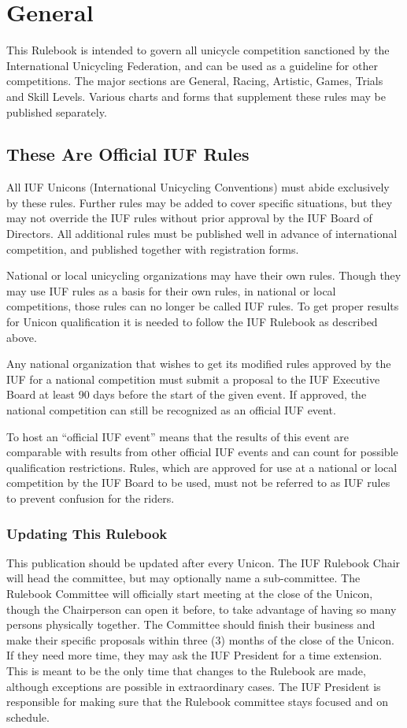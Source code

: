 \chapter{General}
This Rulebook is intended to govern all unicycle competition sanctioned by the International Unicycling Federation, and can be used as a guideline for other competitions.
The major sections are General, Racing, Artistic, Games, Trials and Skill Levels.
Various charts and forms that supplement these rules may be published separately. 

\section{These Are Official IUF Rules}
All IUF Unicons (International Unicycling Conventions) must abide exclusively by these rules.
Further rules may be added to cover specific situations, but they may not override the IUF rules without prior approval by the IUF Board of Directors.
All additional rules must be published well in advance of international competition, and published together with registration forms.

National or local unicycling organizations may have their own rules.
Though they may use IUF rules as a basis for their own rules, in national or local competitions, those rules can no longer be called IUF rules.
To get proper results for Unicon qualification it is needed to follow the IUF Rulebook as described above.

Any national organization that wishes to get its modified rules approved by the IUF for a national competition must submit a proposal to the IUF Executive Board at least 90 days before the start of the given event.
If approved, the national competition can still be recognized as an official IUF event.

To host an ``official IUF event'' means that the results of this event are comparable with results from other official IUF events and can count for possible qualification restrictions.
Rules, which are approved for use at a national or local competition by the IUF Board to be used, must not be referred to as IUF rules to prevent confusion for the riders.

\subsection{Updating This Rulebook}
This publication should be updated after every Unicon.
The IUF Rulebook Chair will head the committee, but may optionally name a sub-committee.
The Rulebook Committee will officially start meeting at the close of the Unicon, though the Chairperson can open it before, to take advantage of having so many persons physically together.
The Committee should finish their business and make their specific proposals within three (3) months of the close of the Unicon.
If they need more time, they may ask the IUF President for a time extension.
This is meant to be the only time that changes to the Rulebook are made, although exceptions are possible in extraordinary cases.
The IUF President is responsible for making sure that the Rulebook committee stays focused and on schedule.

